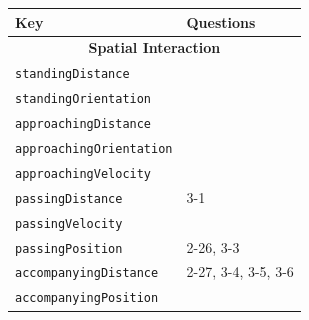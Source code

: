 \documentclass{CSSRforAfrica}
\begin{document}
\begin{table}[H]
\begin{center}
\begin{tabular}{|l l|}
\hline \hline
 {\small \bf Key  }                                         &  {\small \bf Questions }      \\
\hline \hline
\multicolumn{2}{|c|}{{\footnotesize \bf Spatial Interaction}} \\
\hline
{\footnotesize \verb+standingDistance+} 	           &{\footnotesize \verb++} \vspace{-1mm}\\
{\footnotesize \verb+standingOrientation+} 	           &  {\footnotesize \verb++} \vspace{-1mm}\\
{\footnotesize \verb+approachingDistance+} 	   &  {\footnotesize \verb++} \vspace{-1mm}\\
{\footnotesize \verb+approachingOrientation+} 	   & {\footnotesize \verb++} \vspace{-1mm}\\
{\footnotesize \verb+approachingVelocity+} 	           & {\footnotesize \verb++} \vspace{-1mm}\\
{\footnotesize \verb+passingDistance+} 	           &{\footnotesize 3-1} \vspace{-1mm}\\
{\footnotesize \verb+passingVelocity+} 	                  & {\footnotesize \verb++} \vspace{-1mm}\\
{\footnotesize \verb+passingPosition+} 	           & {\footnotesize 2-26, 3-3} \vspace{-1mm}\\
{\footnotesize \verb+accompanyingDistance+} 	   & {\footnotesize 2-27, 3-4, 3-5, 3-6} \vspace{-1mm}\\
{\footnotesize \verb+accompanyingPosition+} 	   & {\footnotesize \verb++} \\
\hline \hline



\end{tabular}
\end{center}
\end{table}
\end{document}
